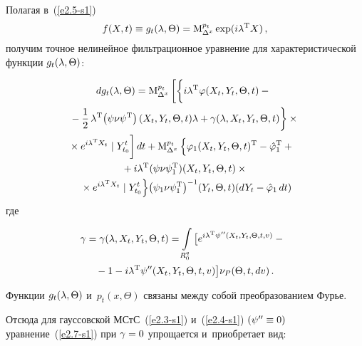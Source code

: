 \begin{multicols}{2}
Полагая в~(\ref{e2.5-s1}) 
$$
f(X,t) \equiv g_t (\lambda,\Theta) =\mathrm{M}_{\Delta^x}^{p_t}\exp (i\lambda^{\mathrm{T}} X)\,,
$$
 получим
точное нелинейное фильт\-ра\-ци\-он\-ное урав\-не\-ние для  характеристической функции 
$g_t (\lambda,\Theta)$:

\noindent
    \begin{multline}
    dg_t (\la,\Theta) = {\mm}_{\Delta^x}^{p_t} \left[ 
    \left\{ \vphantom{\fr{1}{2}}
     i\la^{\mathrm{T}} \varphi (X_t,Y_t,\Theta, t) -{}\right.\right.\\
\left. \!\!\!\!\!  {}- \fr{1}{2}\, 
    \la^{\mathrm{T}}\! \left(\psi\nu\psi^{\mathrm{T}}\right) (X_t,Y_t,\Theta, t) \la+
    \gamma (\la, X_t, Y_t, \Theta, t) \right\}\times{}\hspace*{-6.32312pt}
   \\
\hspace*{-7pt}\left.{}\times e^{i\la^{\mathrm{T}} X_t} \mid Y_{t_0}^t 
\vphantom{\fr{1}{2}}\right] dt+ 
{\mm}_{\Delta^x}^{p_t} %
\left\{ 
\vphantom{e^{i\la^{\mathrm{T}} X_t} \mid Y_{t_0}^t}
\varphi_1 (X_t,Y_t,\Theta, t)^{\mathrm{T}} 
-\hat\varphi_1^{\mathrm{T}} +{}\right. %
\\
{}+
    i\la^{\mathrm{T}} (\psi\nu\psi_1^{\mathrm{T}}) (X_t,Y_t, \Theta,t) \times{}\\
\hspace*{-2.5mm}{}\left.{}\times e^{i\la^{\mathrm{T}} X_t} \mid Y_{t_0}^t \right\} \!
\left(\psi_1\nu\psi_1^{\mathrm{T}}\right)^{-1} \!(Y_t,\Theta,t) (dY_t-\hat\varphi_1
    \,dt) %
    \!\!\! \!\label{e2.9-s1}
    \end{multline}
где

\noindent
\begin{multline}
    \hspace*{-4pt}\gamma=\gamma (\lambda, X_t, Y_t, \Theta, t)=
    \int\limits_{R_0^q}\big[ e^{i\lambda^{\mathrm{T}} \psi''(X_t,Y_t,\Theta, t,v)} -
    {}\\
 {}- 1- i\lambda^{\mathrm{T}} \psi''(X_t,Y_t,\Theta, t,v)\big] \nu_P (\Theta, t, dv)\,.
\label{e2.10-s1}
    \end{multline}

Функции $g_t (\lambda,\Theta)$ и~$p_t(x,\Theta)$ связаны между собой преобразованием Фурье.

Отсюда для гауссовской МСтС~(\ref{e2.3-s1}) и~(\ref{e2.4-s1}) $(\psi''\hm\equiv 0)$ уравнение~(\ref{e2.7-s1}) 
при  $\gamma\hm=0$ упрощается и~приобретает вид:


\end{multicols}
